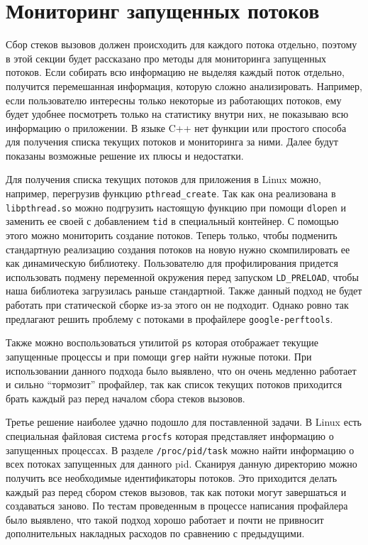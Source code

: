 \section{Мониторинг запущенных потоков}
	Сбор стеков вызовов должен происходить для каждого потока отдельно, поэтому в этой секции будет рассказано про методы для мониторинга запущенных потоков. Если собирать всю информацию не выделяя каждый поток отдельно, получится перемешанная информация, которую сложно анализировать. Например, если пользователю интересны только некоторые из работающих потоков, ему будет удобнее посмотреть только на статистику внутри них, не показываю всю информацию о приложении. В языке C++ \cite{meyers} нет функции или простого способа для получения списка текущих потоков и мониторинга за ними. Далее будут показаны возможные решение их плюсы и недостатки.
    
    Для получения списка текущих потоков для приложения в Linux можно, например, перегрузив функцию \verb|pthread_create|. Так как она реализована в \verb|libpthread.so| можно подгрузить настоящую функцию при помощи \verb|dlopen| и заменить ее своей с добавлением \verb|tid| в специальный контейнер. С помощью этого можно мониторить создание потоков. Теперь только, чтобы подменить стандартную реализацию создания потоков на новую нужно скомпилировать ее как динамическую библиотеку. Пользователю для профилирования придется использовать подмену переменной окружения перед запуском \verb|LD_PRELOAD|, чтобы наша библиотека загрузилась раньше стандартной. Также данный подход не будет работать при статической сборке из-за этого он не подходит. Однако ровно так предлагают решить проблему с потоками в профайлере \verb|google-perftools|.
    
    Также можно воспользоваться утилитой \verb|ps| которая отображает текущие запущенные процессы и при помощи \verb|grep| найти нужные потоки. При использовании данного подхода было выявлено, что он очень медленно работает и сильно \enquote{тормозит} профайлер, так как список текущих потоков приходится брать каждый раз перед началом сбора стеков вызовов. 
    
    Третье решение наиболее удачно подошло для поставленной задачи. В Linux есть специальная файловая система \verb|procfs| которая представляет информацию о запущенных процессах. В разделе \verb|/proc/pid/task| можно найти информацию о всех потоках запущенных для данного pid. Сканируя данную директорию можно получить все необходимые идентификаторы потоков. Это приходится делать каждый раз перед сбором стеков вызовов, так как потоки могут завершаться и создаваться заново. По тестам проведенным в процессе написания профайлера было выявлено, что такой подход хорошо работает и почти не привносит дополнительных накладных расходов по сравнению с предыдущими.    
    
